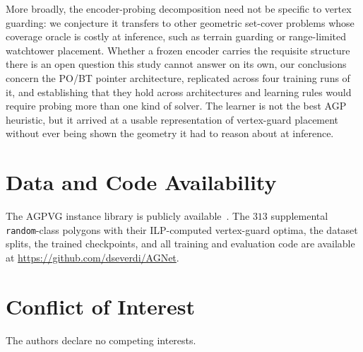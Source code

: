\documentclass[11pt]{article}
\begin{document}
More broadly, the encoder-probing decomposition need not be specific to vertex guarding: we conjecture it transfers to other geometric set-cover problems whose coverage oracle is costly at inference, such as terrain guarding or range-limited watchtower placement. Whether a frozen encoder carries the requisite structure there is an open question this study cannot answer on its own, our conclusions concern the PO/BT pointer architecture, replicated across four training runs of it, and establishing that they hold across architectures and learning rules would require probing more than one kind of solver. The learner is not the best AGP heuristic, but it arrived at a usable representation of vertex-guard placement without ever being shown the geometry it had to reason about at inference.

\section*{Data and Code Availability}

The AGPVG instance library is publicly available~\cite{art-gallery-instances-page}. The $313$ supplemental \texttt{random}-class polygons with their ILP-computed vertex-guard optima, the dataset splits, the trained checkpoints, and all training and evaluation code are available at \url{https://github.com/dseverdi/AGNet}.



\section*{Conflict of Interest}

The authors declare no competing interests.



\end{document}
